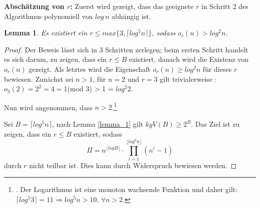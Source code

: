 \documentclass[12pt,oneside]{article}
\newtheorem{lemma}[theorem]{Lemma}
\theoremstyle{remark}
\theoremstyle{definition}
\begin{document}
\textbf{Abschätzung von $r$:}
Zuerst wird gezeigt, dass das geeignete $r$ in Schritt 2 des Algorithmus polynomiell von $log \, n$ abhängig ist.  

\begin{lemma}\label{limit_of_r}
Es existiert ein $ r \leq max \{ 3, \lceil log^5 n \rceil \}$, sodass $o_{r}(n) > log^2 n$.
\end{lemma}


\begin{proof}
Der Beweis lässt sich in 3 Schritten zerlegen; beim ersten Schritt handelt es sich darum, zu zeigen, dass ein $r \leq B$ existiert, danach wird die Existenz von $o_{r}(n)$ gezeigt. Als letztes wird die Eigenschaft $o_{r}(n) \geq log^2 n$ für dieses $r$ bewiesen.\newline\newline
Zunächst sei $n > 1$, für $n = 2$ und $r = 3$ gilt trivialerweise :\newline\newline $o_{3}(2) = 2^2 = 4 = 1 $(mod 3) > 1 = $log^2 2$.

Nun wird angenommen, dass $n > 2$.\footnote{. Der Logarithmus ist eine monoton wachsende Funktion und daher gilt:\newline $\lceil log^5 3 \rceil = 11 \Rightarrow log^5 n > 10, \,  \forall n > 2$.}\newline\newline

Sei $B = \lceil log^5 n \rceil$, nach Lemma \ref{lemma_1} gilt $kgV(B) \geq 2^B$. Das Ziel ist zu zeigen, dass   ein $r \leq B$ existiert, sodass
\begin{equation}\label{prod_cor}
     \Pi = n^{\lfloor log B \rfloor } \cdot \prod_{i = 1}^{\lfloor log^2 n \rfloor} (n^i - 1)
\end{equation}
durch $r$ nicht teilbar ist. Dies kann durch Widerspruch bewiesen werden.


\end{proof}
\end{document}
